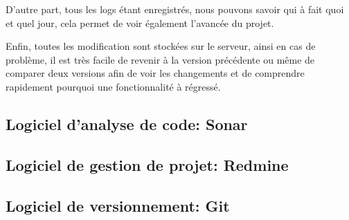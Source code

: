 \documentclass[12pt,a4paper,openany]{book}
\begin{document}
	D'autre part, tous les logs étant enregistrés, nous pouvons savoir qui à fait quoi et quel jour, cela permet de voir également l'avancée du projet. 

	Enfin, toutes les modification sont stockées sur le serveur, ainsi en cas de problème, il est très facile de revenir à la version précédente ou même de
	comparer deux versions afin de voir les changements et de comprendre rapidement pourquoi une fonctionnalité à régressé. 

	\subsection{Logiciel d'analyse de code: Sonar}
	\subsection{Logiciel de gestion de projet: Redmine}
	\subsection{Logiciel de versionnement: Git}
\end{document}
